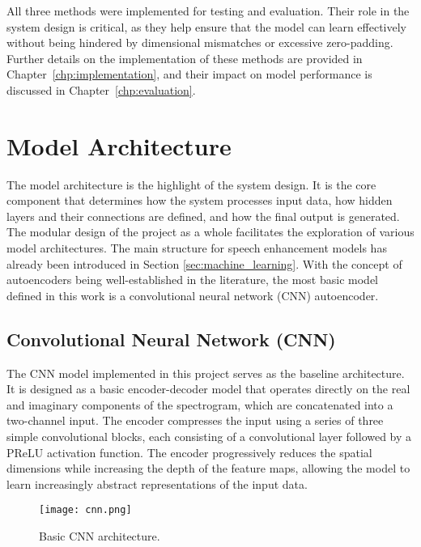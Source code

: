 All three methods were implemented for testing and evaluation. Their role in the system design is critical, as they help ensure that the model can learn effectively without being hindered by dimensional mismatches or excessive zero-padding. Further details on the implementation of these methods are provided in Chapter~\ref{chp:implementation}, and their impact on model performance is discussed in Chapter~\ref{chp:evaluation}.

\section{Model Architecture}
\label{sec:model_architecture}

The model architecture is the highlight of the system design. It is the core component that determines how the system processes input data, how hidden layers and their connections are defined, and how the final output is generated. The modular design of the project as a whole facilitates the exploration of various model architectures. The main structure for speech enhancement models has already been introduced in Section \ref{sec:machine_learning}. With the concept of autoencoders being well-established in the literature, the most basic model defined in this work is a convolutional neural network (CNN) autoencoder.

\subsection{Convolutional Neural Network (CNN)}

The CNN model implemented in this project serves as the baseline architecture. It is designed as a basic encoder-decoder model that operates directly on the real and imaginary components of the spectrogram, which are concatenated into a two-channel input. The encoder compresses the input using a series of three simple convolutional blocks, each consisting of a convolutional layer followed by a PReLU activation function. The encoder progressively reduces the spatial dimensions while increasing the depth of the feature maps, allowing the model to learn increasingly abstract representations of the input data.

\begin{figure}[h]
    \centering
    \texttt{[image: cnn.png]}
    \caption{\label{fig:cnn}Basic CNN architecture.}
\end{figure}

